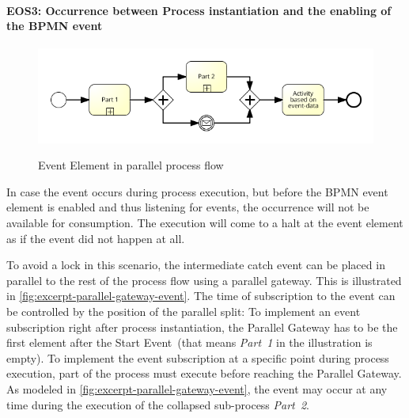 \paragraph{EOS3: Occurrence between Process instantiation and the enabling of the BPMN event}
\begin{figure}[]
	\myfloatalign
	{\includegraphics[width=1\linewidth]{chapters/assessment/parallel-gateway-early-subscription.png}}
	\caption{Event Element in parallel process flow}\label{fig:excerpt-parallel-gateway-event}
\end{figure}

In case the event occurs during process execution, but before the BPMN event element is enabled and thus listening for events, the occurrence will not be available for consumption. 
The execution will come to a halt at the event element as if the event did not happen at all.


To avoid a lock in this scenario, the intermediate catch event can be placed in parallel to the rest of the process flow using a parallel gateway. 
This is illustrated in \autoref{fig:excerpt-parallel-gateway-event}. The time of subscription to the event can be controlled by the position of the parallel split: To implement an event subscription right after process instantiation, the Parallel Gateway has to be the first element after the Start Event~(that means \textit{Part~1} in the illustration is empty). 
To implement the event subscription at a specific point during process execution, part of the process must execute before reaching the Parallel Gateway. As modeled in \autoref{fig:excerpt-parallel-gateway-event}, the event may occur at any time during the execution of the collapsed sub-process \textit{Part~2}. 

